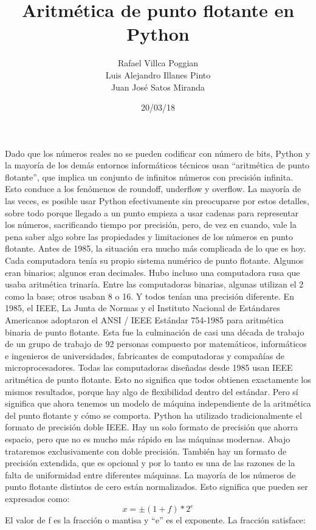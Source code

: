 \documentclass[12pt]{article}
\title{Aritmética de punto flotante en Python}
\author{Rafael Villca Poggian\\Luis Alejandro Illanes Pinto\\Juan José Satos Miranda}
\date{20/03/18}
\begin{document}
\maketitle
\graphicspath{ {/home/rafael/Desktop/Codes/Analisis_Numerico/art/} }
Dado que los números reales no se pueden codificar con número de bits, Python y la mayoría de los demás entornos informáticos técnicos usan “aritmética de punto flotante”, que implica un conjunto de infinitos números con precisión infinita. Esto conduce a los fenómenos de roundoff, underflow y overflow. La mayoría de las veces, es posible usar Python efectivamente sin preocuparse por estos detalles, sobre todo porque llegado a un punto empieza a usar cadenas para representar los n\'umeros, sacrificando tiempo por precisi\'on, pero, de vez en cuando, vale la pena saber algo sobre las propiedades y limitaciones de los números en punto flotante.
Antes de 1985, la situación era mucho más complicada de lo que es hoy. Cada computadora tenía su propio sistema numérico de punto flotante. Algunos eran binarios; algunos eran decimales. Hubo incluso una computadora rusa que usaba aritmética trinaría. Entre las computadoras binarias, algunas utilizan el 2 como la base; otros usaban 8 o 16. Y todos tenían una precisión diferente. En 1985, el IEEE, La Junta de Normas y el Instituto Nacional de Estándares Americanos adoptaron el ANSI / IEEE Estándar 754-1985 para aritmética binaria de punto flotante. Esta fue la culminación de casi una década de trabajo de un grupo de trabajo de 92 personas compuesto por matemáticos, informáticos e ingenieros de universidades, fabricantes de computadoras y compañías de microprocesadores.
Todas las computadoras diseñadas desde 1985 usan IEEE aritmética de punto flotante. Esto no significa que todos obtienen exactamente los mismos resultados, porque hay algo de flexibilidad dentro del estándar. Pero sí significa que ahora tenemos un modelo de máquina independiente de la aritmética del punto flotante y cómo se comporta. 
Python ha utilizado tradicionalmente el formato de precisión doble IEEE. Hay un solo formato de precisión que ahorra espacio, pero que no es mucho más rápido en las máquinas modernas. Abajo trataremos exclusivamente con doble precisión. También hay un formato de precisión extendida, que es opcional y por lo tanto es una de las razones de la falta de uniformidad entre diferentes máquinas.
La mayoría de los números de punto flotante distintos de cero están normalizados. Esto significa que pueden ser expresados como:
$$x = \pm{(1+f)}*2^e$$
El valor de f es la fracción o mantisa y “e” es el exponente. La fracción satisface:
\end{document}
